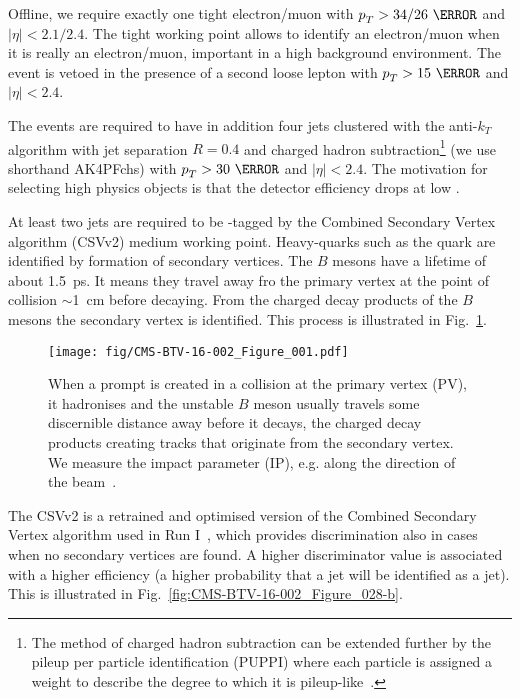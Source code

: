Offline, we require exactly one tight electron/muon with $\pt>34/26~\GeV$ and $|\eta|<2.1/2.4$. The tight working point allows to identify an electron/muon when it is really an electron/muon, important in a high background environment. The event is vetoed in the presence of a second loose lepton with $\pt>15~\GeV$ and $|\eta| < 2.4$.

The events are required to have in addition four jets clustered with the anti-$k_{T}$ algorithm with jet separation $R=0.4$ and charged hadron subtraction\footnote{The method of charged hadron subtraction can be extended further by the pileup per particle identification (PUPPI) where each particle is assigned a weight to describe the degree to which it is pileup-like~\cite{Bertolini:2014bba}.} (we use shorthand AK4PFchs) with $\pt>30~\GeV$  and $|\eta|<2.4$. The motivation for selecting high \pt physics objects is that the detector efficiency drops at low \pt.

At least two jets are required to be \cPqb-tagged by the Combined Secondary Vertex algorithm (CSVv2) medium working point. Heavy-quarks such as the \cPqb quark are identified by formation of secondary vertices. The $B$ mesons have a lifetime of about 1.5~ps. It means they travel away fro the primary vertex at the point of collision $\sim$1~cm before decaying. From the charged decay products of the $B$ mesons the secondary vertex is identified. This process is illustrated in Fig.~\ref{fig:CMS-BTV-16-002_Figure_001}.

\begin{figure}[hbtp]
\centering
\texttt{[image: fig/CMS-BTV-16-002\_Figure\_001.pdf]}
\caption{When a prompt \cPqb is created in a collision at the primary vertex (PV), it hadronises and the unstable $B$ meson usually travels some discernible distance away before it decays, the charged decay products creating tracks that originate from the secondary vertex. We measure the impact parameter (IP), e.g. along the direction of the beam~\cite{Sirunyan:2017ezt}.}
\label{fig:CMS-BTV-16-002_Figure_001}
\end{figure}

The CSVv2 is a retrained and optimised version of the Combined Secondary Vertex algorithm used in Run I~\cite{Chatrchyan:2012jua}, which provides discrimination also in cases when no secondary vertices are found. A higher discriminator value is associated with a higher efficiency (a higher probability that a \cPqb jet will be identified as a \cPqb jet). This is illustrated in Fig.~\ref{fig:CMS-BTV-16-002_Figure_028-b}.


